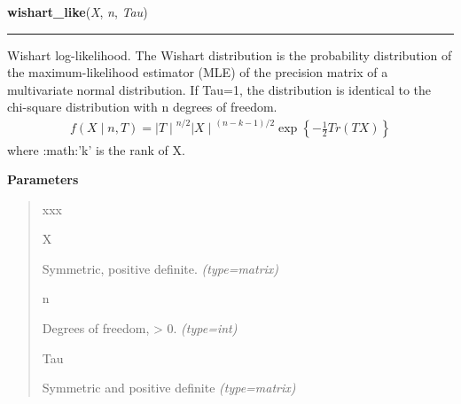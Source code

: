    \begin{boxedminipage}{\textwidth}

    \raggedright \textbf{wishart\_like}(\textit{X}, \textit{n}, \textit{Tau})

    \vspace{-1.5ex}

    \rule{\textwidth}{0.5\fboxrule}

Wishart log-likelihood. The Wishart distribution is the probability
distribution of the maximum-likelihood estimator (MLE) of the precision
matrix of a multivariate normal distribution. If Tau=1, the distribution
is identical to the chi-square distribution with n degrees of freedom.
\begin{equation*}\begin{split}f(X \mid n, T) = {\mid T \mid}^{n/2}{\mid X \mid}^{(n-k-1)/2} \exp\left\{ -\frac{1}{2} Tr(TX) \right\}\end{split}\end{equation*}
where :math:'k' is the rank of X.
    \vspace{1ex}

      \textbf{Parameters}
      \begin{quote}
        \begin{Ventry}{xxx}

          \item[X]


Symmetric, positive definite.
            \textit{(type=matrix)}

          \item[n]


Degrees of freedom, {\textgreater} 0.
            \textit{(type=int)}

          \item[Tau]


Symmetric and positive definite
            \textit{(type=matrix)}

        \end{Ventry}

      \end{quote}

    \vspace{1ex}

    \end{boxedminipage}

    \label{pymc:distributions:rwishart_cov}

    \vspace{0.5ex}

